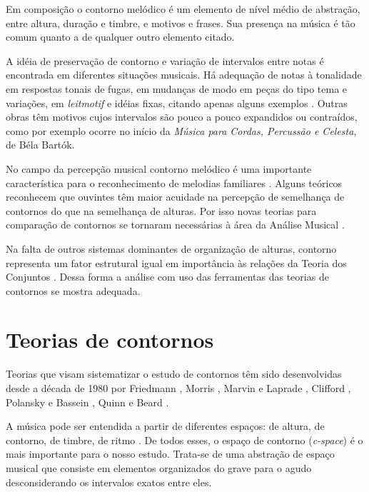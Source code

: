\documentclass{article}
\newcommand{\eng}[1]{\textit{#1}}
\newcommand{\opus}[1]{\textit{#1}}
\begin{document}
Em composição o contorno melódico é um elemento de nível médio de
abstração, entre altura, duração e timbre, e motivos e frases. Sua
presença na música é tão comum quanto a de qualquer outro elemento
citado.

A idéia de preservação de contorno e variação de intervalos entre
notas é encontrada em diferentes situações musicais. Há adequação de
notas à tonalidade em respostas tonais de fugas, em mudanças de modo
em peças do tipo tema e variações, em \eng{leitmotif} e idéias fixas,
citando apenas alguns exemplos
\cite[p. 29]{morris87:composition}. Outras obras têm motivos cujos
intervalos são pouco a pouco expandidos ou contraídos, como por
exemplo ocorre no início da \opus{Música para Cordas, Percussão e
  Celesta}, de Béla Bartók.

No campo da percepção musical contorno melódico é uma importante
característica para o reconhecimento de melodias familiares
\cite[p. 136]{dowling.ea86:music}. Alguns teóricos reconhecem que
ouvintes têm maior acuidade na percepção de semelhança de contornos do
que na semelhança de alturas. Por isso novas teorias para comparação
de contornos se tornaram necessárias à área da Análise Musical
\cite[p. 226]{marvin.ea87:relating}.


Na falta de outros sistemas dominantes de organização de alturas,
contorno representa um fator estrutural igual em importância às
relações da Teoria dos Conjuntos \cite[p. 157]{clifford95:contour}.
Dessa forma a análise com uso das ferramentas das teorias de contornos
se mostra adequada.



\section{Teorias de contornos}
\label{sec:teorias-de-contornos}

Teorias que visam sistematizar o estudo de contornos têm sido
desenvolvidas desde a década de 1980 por Friedmann
\cite{friedmann85:methodology,friedmann87:response}, Morris
\cite{morris87:composition,morris93:directions}, Marvin e Laprade
\cite{marvin.ea87:relating}, Clifford \cite{clifford95:contour},
Polansky e Bassein \cite{polansky.ea92:possible}, Quinn
\cite{quinn97:fuzzy} e Beard \cite{beard03:contour}.

A música pode ser entendida a partir de diferentes espaços: de altura,
de contorno, de timbre, de ritmo \cite{morris87:composition}. De todos
esses, o espaço de contorno (\eng{c-space}) é o mais importante para o
nosso estudo. Trata-se de uma abstração de espaço musical que consiste
em elementos organizados do grave para o agudo desconsiderando os
intervalos exatos entre eles.
\end{document}
